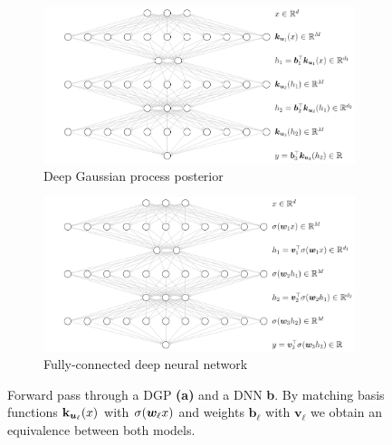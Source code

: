 \begin{figure}[t]
    \centering
    \begin{subfigure}[b]{0.48\textwidth}
         \centering
        \includegraphics[width=\textwidth]{dgp_v2}
        \caption{Deep Gaussian process posterior}
        \label{fig:visual-dgp}
     \end{subfigure}
     \hfill
     \begin{subfigure}[b]{0.51\textwidth}
         \centering
        \includegraphics[width=\textwidth]{nn_v2}
         \caption{Fully-connected deep neural network}
         \label{fig:visual-nn}
     \end{subfigure}
    \caption{Forward pass through a DGP \textbf{(a)} and a DNN \textbf{b}. By matching basis functions $\mathbf{k}_{\bm{u}_\ell}(x)$ with $\sigma(\bm{w}_\ell x)$ and weights $\bm{b}_\ell$ with $\bm{v}_\ell$ we obtain an equivalence between both models.} %
    \label{fig:visual}
\end{figure}

